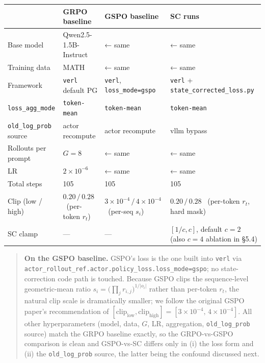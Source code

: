 \documentclass[11pt,a4paper]{article}
\theoremstyle{remark}
\begin{document}
\begin{table}[H]\centering\small
\setlength{\tabcolsep}{5pt}
\begin{tabularx}{\textwidth}{LLLL}
\toprule
\textbf{} & \textbf{GRPO baseline} & \textbf{GSPO baseline} & \textbf{SC runs} \\
\midrule
Base model & Qwen2.5-1.5B-Instruct & ← same & ← same \\
Training data & MATH & ← same & ← same \\
Framework & \texttt{verl} default PG & \texttt{verl}, \texttt{loss\_mode=gspo} & \texttt{verl} + \texttt{state\_corrected\_loss.py} \\
\texttt{loss\_agg\_mode} & \texttt{token-mean} & \texttt{token-mean} & \texttt{token-mean} \\
\texttt{old\_log\_prob} source & actor recompute & actor recompute & vllm bypass \\
Rollouts per prompt & $G=8$ & ← same & ← same \\
LR & $2\times 10^{-6}$ & ← same & ← same \\
Total steps & 105 & 105 & 105 \\
Clip (low / high) & $0.20\,/\,0.28$ \ (per-token $r_t$) & $3\!\times\!10^{-4}\,/\,4\!\times\!10^{-4}$ \ (per-seq $s_i$) & $0.20\,/\,0.28$ \ (per-token $r_t$, hard mask) \\
SC clamp & --- & --- & $[1/c, c]$, default $c=2$ (also $c=4$ ablation in §5.4) \\
\bottomrule
\end{tabularx}
\end{table}

\begin{quote}
\textbf{On the GSPO baseline.} GSPO's loss is the one built into \texttt{verl} via \texttt{actor\_rollout\_ref.actor.policy\_loss.loss\_mode=gspo}; no state-correction code path is touched. Because GSPO clips the sequence-level geometric-mean ratio $s_i=\big(\prod_j r_{i,j}\big)^{1/|o_i|}$ rather than per-token $r_t$, the natural clip scale is dramatically smaller; we follow the original GSPO paper's recommendation of $[\text{clip}_{\text{low}},\text{clip}_{\text{high}}]=[3\!\times\!10^{-4},\,4\!\times\!10^{-4}]$. All other hyperparameters (model, data, $G$, LR, aggregation, \texttt{old\_log\_prob} source) match the GRPO baseline exactly, so the GRPO-vs-GSPO comparison is clean and GSPO-vs-SC differs only in (i) the loss form and (ii) the \texttt{old\_log\_prob} source, the latter being the confound discussed next.
\end{quote}
\end{document}
